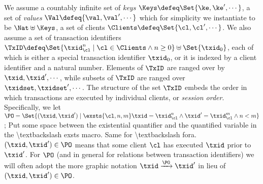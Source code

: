 

We assume a countably infinite set of \emph{keys} $\Keys \defeq \Set{\ke, \ke', \cdots}$, 
a set of \emph{values} $\Val \defeq \{\val, \val', \cdots\}$ which for simplicity we instantiate to be 
$\Nat \uplus \Keys$, a set of clients $\Clients \defeq \Set{\cl, \cl',\cdots}$. 
We also assume a set of transaction identifiers $\TxID \defeq \Set{ \txid_{\cl}^{n} \mid \cl \in \Clients \wedge n \geq 0 } 
\uplus \Set{\txid_{0}}$,
each of which is either a special transaction identifier $\txid_0$, 
or it is indexed by a client identifier and a natural number. 
Elements of $\TxID$ are ranged over by $\txid, \txid', \cdots$, 
while subsets of $\TxID$ are ranged over $\txidset, \txidset', \cdots$. 
The structure of the set $\TxID$  
embeds the order in which transactions are executed by individual clients, or \emph{session order}. 
Specifically, we let $\PO = \Set{ (\txid, \txid') \mid \exsts{ \cl, n,m } \txid = \txid_{\cl}^{n} \wedge 
\txid' = \txid_{\cl}^{m} \wedge n < m}$; 
\ac{Put some space between the existential quantifier and the quantified variable in the \textbackslash exsts macro. 
Same for \textbackslash fora.}
$(\txid, \txid') \in \PO$ means that 
some client $\cl$ has executed $\txid$ prior to $\txid'$. For $\PO$ (and in general  
for relations between transaction identifiers) we will often adopt the more graphic notation 
$\txid \xrightarrow{\PO} \txid'$ in lieu of $(\txid, \txid') \in \PO$.

